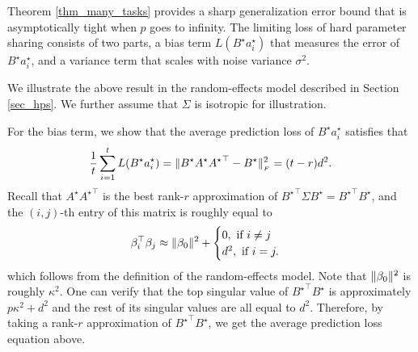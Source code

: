 	Theorem \ref{thm_many_tasks} provides a sharp generalization error bound that is asymptotically tight when $p$ goes to infinity.
	The limiting loss of hard parameter sharing consists of two parts, a bias term $L(B^{\star} a_i^{\star})$ that measures the error of $B^{\star} a_i^{\star}$, and a variance term that scales with noise variance $\sigma^2$.

\begin{example}\label{ex_same_cov}
We illustrate the above result in the random-effects model described in Section \ref{sec_hps}.
We further assume that $\Sigma$ is isotropic for illustration.

For the bias term, we show that the average prediction loss of $B^{\star} a_i^{\star}$ satisfies that
\[ \frac{1}{t} \sum_{i=1}^t L(B^{\star} a_i^{\star}) = \|B^{\star} A^{\star} {A^{\star}}^{\top} - B^{\star}\|_{_{F}}^2 = (t - r) d^2. \]
Recall that $A^{\star} {A^{\star}}^{\top}$ is the best rank-$r$ approximation of ${B^{\star}}^{\top}\Sigma B^{\star} = {B^{\star}}^{\top} B^{\star}$, and the $(i, j)$-th entry of this matrix is roughly equal to
\begin{align*}
	\beta_i^{\top} \beta_j \approx \|\beta_0\|^2 + \begin{cases}
																								0, \text{ if } i \neq j \\
																								d^2, \text{ if } i = j.
	\end{cases}
\end{align*}
which follows from the definition of the random-effects model.
Note that $\|\beta_0\|^2$ is roughly $\kappa^2$.
One can verify that the top singular value of ${B^{\star}}^{\top} B^{\star}$ is approximately $p \kappa^2 + d^2$ and the rest of its singular values are all equal to $d^2$.
Therefore, by taking a rank-$r$ approximation of ${B^{\star}}^{\top} B^{\star}$, we get the average prediction loss equation above.


\end{example}
